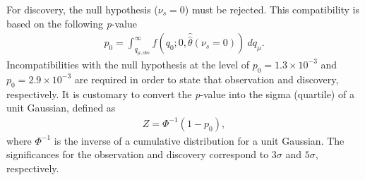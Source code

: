 For discovery, the null hypothesis ($\nu_s = 0$) must be rejected. This compatibility is based on the following \emph{p}-value
\begin{equation}
    \label{eq:pvalue_bonly}
    \begin{aligned}
        p_{0} = \int_{q_{\mu,obs}}^\infty f(q_0;0,\hat{\hat{\theta}}(\nu_s =0))~dq_\mu.
    \end{aligned}
\end{equation}
Incompatibilities with the null hypothesis at the level of $p_0 = 1.3 \times 10^{-3}$ and $p_0 = 2.9 \times 10^{-3}$ are required in order to state that observation and discovery, respectively. It is customary to convert the \emph{p}-value into the sigma (quartile) of a unit Gaussian, defined as
\begin{equation}
    \label{eq:sigma}
    \begin{aligned}
    Z = \Phi^{-1}(1-p_0),
    \end{aligned}
\end{equation}
where $\Phi^{-1}$ is the inverse of a cumulative distribution for a unit Gaussian. The significances for the observation and discovery correspond to $3\sigma$ and $5\sigma$, respectively.

